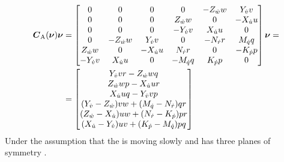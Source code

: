\begin{equation}
\begin{split}
    \boldsymbol{C}_\text{A}(\boldsymbol{\nu}) \boldsymbol{\nu} &= 
    \begin{bmatrix}
    0 & 0 & 0 & 0 & -Z_{\dot{w}} w & Y_{\dot{v}} v \\
    0 & 0 & 0 & Z_{\dot{w}} w & 0 & -X_{\dot{u}} u \\
    0 & 0 & 0 & -Y_{\dot{v}} v & X_{\dot{u}} u & 0 \\
    0 & -Z_{\dot{w}} w & Y_{\dot{v}} v & 0 & -N_{\dot{r}} r & M_{\dot{q}} q \\
    Z_{\dot{w}} w & 0 & -X_{\dot{u}} u & N_{\dot{r}} r & 0 & -K_{\dot{p}} p \\
    -Y_{\dot{v}} v & X_{\dot{u}} u & 0 & - M_{\dot{q}} q & K_{\dot{p}} p & 0 \\
    \end{bmatrix}
    \boldsymbol{\nu} = \\ 
    &= \begin{bmatrix}
        Y_{\dot{v}} v r - Z_{\dot{w}} w q\\
        Z_{\dot{w}} w p - X_{\dot{u}} u r\\
        X_{\dot{u}} u q - Y_{\dot{v}} v p \\
        (Y_{\dot{v}} - Z_{\dot{w}}) v w + (M_{\dot{q}} - N_{\dot{r}}) q r\\
        (Z_{\dot{w}} - X_{\dot{u}}) u w + (N_{\dot{r}} - K_{\dot{p}}) p r\\
        (X_{\dot{u}} - Y_{\dot{v}}) u v + (K_{\dot{p}} - M_{\dot{q}}) p q \\
    \end{bmatrix}
\end{split}
\end{equation} Under the assumption that the \abbrROV is moving slowly and has three planes of symmetry \citep[p. 121]{fossen2011}. 


